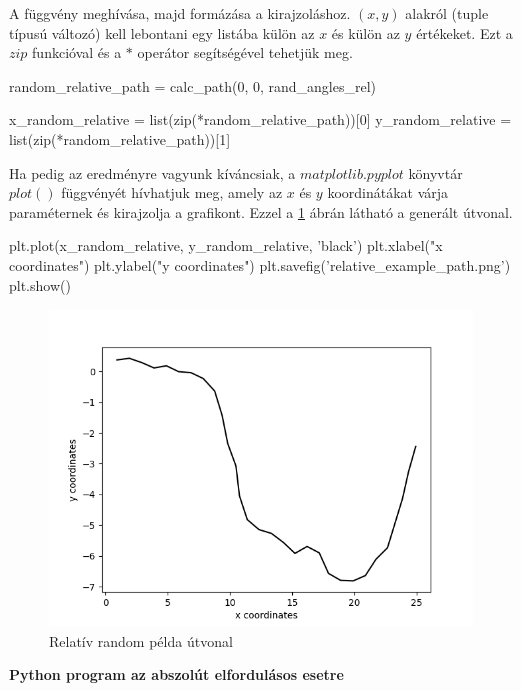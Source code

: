 A függvény meghívása, majd formázása a kirajzoláshoz. $ (x, y) $ alakról (tuple típusú változó) kell lebontani egy listába külön az $ x $ és külön az $ y $ értékeket. Ezt a $ zip $ funkcióval és a $ * $ operátor segítségével tehetjük meg.

\begin{python}
random_relative_path = calc_path(0, 0, rand_angles_rel)

x_random_relative = list(zip(*random_relative_path))[0]
y_random_relative = list(zip(*random_relative_path))[1]
\end{python}

Ha pedig az eredményre vagyunk kíváncsiak, a $ matplotlib.pyplot $ könyvtár  $ plot() $ függvényét hívhatjuk meg, amely az $ x $ és $ y $ koordinátákat várja paraméternek és kirajzolja a grafikont. Ezzel a \ref{fig:relative_path} ábrán látható a generált útvonal.

\begin{python}
plt.plot(x_random_relative, y_random_relative, 'black')
plt.xlabel("x coordinates")
plt.ylabel("y coordinates")
plt.savefig('relative_example_path.png')
plt.show()
\end{python}


\begin{figure}[h!]
\centering
\includegraphics[scale=0.75]{images/relative_example_path.png}
\caption{Relatív random példa útvonal}
\label{fig:relative_path}
\end{figure}

\textbf{Python program az abszolút elfordulásos esetre}\\

